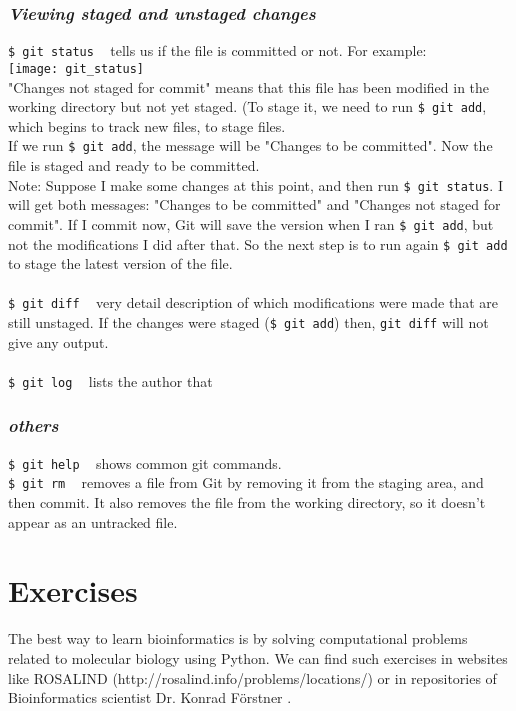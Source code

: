 \documentclass{article}
\begin{document}
{{{\subsubsection{\small\textsl{Viewing staged and unstaged changes}}
\texttt{\$ git status} ~ tells us if the file is committed or not. For example:\\
\texttt{[image: git\_status]}\\
"Changes not staged for commit" means that this file has been modified in the working directory but not yet staged. (To stage it, we need to run \texttt{\$ git add}, which begins to track new files, to stage files. \\
If we run \texttt{\$ git add}, the message will be "Changes to be committed". Now the file is staged and ready to be committed.\\ 
Note: Suppose I make some changes at this point, and then run \texttt{\$ git status}. I will get both messages: "Changes to be committed" and "Changes not staged for commit". If I commit now, Git will save the version when I ran \texttt{\$ git add}, but not the modifications I did after that. So the next step is to run again \texttt{\$ git add} to stage the latest version of the file.\\
\\
\texttt{\$ git diff} ~ very detail description of which modifications were made that are still unstaged. If the changes were staged (\texttt{\$ git add}) then, \texttt{git diff} will not give any output. \\
\\
\texttt{\$ git log} ~ lists the author that 

\subsubsection{\small\textsl{others}}
\texttt{\$ git help} ~ shows common git commands. \\
\texttt{\$ git rm} ~ removes a file from Git by removing it from the staging area, and then commit. It also removes the file from the working directory, so it doesn't appear as an untracked file. 


\newpage
\section{Exercises}
The best way to learn bioinformatics is by solving computational problems related to molecular biology using Python. We can find such exercises in websites like ROSALIND (http://rosalind.info/problems/locations/) or in repositories of Bioinformatics scientist Dr. Konrad F\"orstner . \\

}}}
\end{document}
